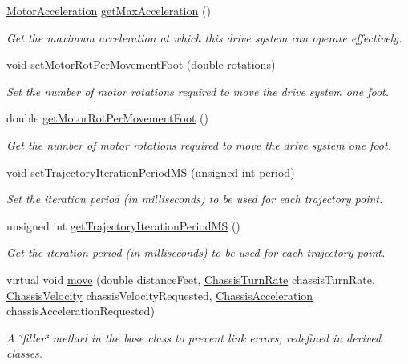 \begin{DoxyCompactItemize}
\hyperlink{classMotorAcceleration}{Motor\-Acceleration} \hyperlink{classDriveSystem_a6d675fc43ab54446f62d1abb9e888ac5}{get\-Max\-Acceleration} ()
\begin{DoxyCompactList}\small\item\em Get the maximum acceleration at which this drive system can operate effectively. \end{DoxyCompactList}\item 
void \hyperlink{classDriveSystem_a3db4b8e79e330dbf2a013cc8c7c462b5}{set\-Motor\-Rot\-Per\-Movement\-Foot} (double rotations)
\begin{DoxyCompactList}\small\item\em Set the number of motor rotations required to move the drive system one foot. \end{DoxyCompactList}\item 
double \hyperlink{classDriveSystem_a0ec467bebb7953e764e81435c6a75f2d}{get\-Motor\-Rot\-Per\-Movement\-Foot} ()
\begin{DoxyCompactList}\small\item\em Get the number of motor rotations required to move the drive system one foot. \end{DoxyCompactList}\item 
void \hyperlink{classDriveSystem_afc47457d594e21405383a680194c834c}{set\-Trajectory\-Iteration\-Period\-M\-S} (unsigned int period)
\begin{DoxyCompactList}\small\item\em Set the iteration period (in milliseconds) to be used for each trajectory point. \end{DoxyCompactList}\item 
unsigned int \hyperlink{classDriveSystem_a6e1dd3cebd19be585ccf2a9079230cfd}{get\-Trajectory\-Iteration\-Period\-M\-S} ()
\begin{DoxyCompactList}\small\item\em Get the iteration period (in milliseconds) to be used for each trajectory point. \end{DoxyCompactList}\item 
virtual void \hyperlink{classDriveSystem_af0f174a092b6b4a13ae589a1d72ff0c8}{move} (double distance\-Feet, \hyperlink{classChassisTurnRate}{Chassis\-Turn\-Rate} chassis\-Turn\-Rate, \hyperlink{classChassisVelocity}{Chassis\-Velocity} chassis\-Velocity\-Requested, \hyperlink{classChassisAcceleration}{Chassis\-Acceleration} chassis\-Acceleration\-Requested)
\begin{DoxyCompactList}\small\item\em A \char`\"{}filler\char`\"{} method in the base class to prevent link errors; redefined in derived classes. \end{DoxyCompactList}\end{DoxyCompactItemize}
